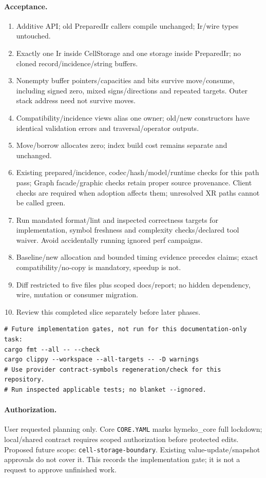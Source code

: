\documentclass[10pt,a4paper]{article}
\newcommand{\code}[1]{{\small\nolinkurl{#1}}}
\begin{document}
\paragraph{Acceptance.}
\begin{enumerate}
\item Additive API; old PreparedIr callers compile unchanged; Ir/wire types untouched.
\item Exactly one Ir inside CellStorage and one storage inside PreparedIr; no cloned record/incidence/string buffers.
\item Nonempty buffer pointers/capacities and bits survive move/consume, including signed zero, mixed signs/directions and repeated targets. Outer stack address need not survive moves.
\item Compatibility/incidence views alias one owner; old/new constructors have identical validation errors and traversal/operator outputs.
\item Move/borrow allocates zero; index build cost remains separate and unchanged.
\item Existing prepared/incidence, codec/hash/model/runtime checks for this path pass; Graph facade/graphic checks retain proper source provenance. Client checks are required when adoption affects them; unresolved XR paths cannot be called green.
\item Run mandated format/lint and inspected correctness targets for implementation, symbol freshness and complexity checks/declared tool waiver. Avoid accidentally running ignored perf campaigns.
\item Baseline/new allocation and bounded timing evidence precedes claims; exact compatibility/no-copy is mandatory, speedup is not.
\item Diff restricted to five files plus scoped docs/report; no hidden dependency, wire, mutation or consumer migration.
\item Review this completed slice separately before later phases.
\end{enumerate}
\begin{lstlisting}
# Future implementation gates, not run for this documentation-only task:
cargo fmt --all -- --check
cargo clippy --workspace --all-targets -- -D warnings
# Use provider contract-symbols regeneration/check for this repository.
# Run inspected applicable tests; no blanket --ignored.
\end{lstlisting}

\paragraph{Authorization.}
User requested planning only. Core \code{CORE.YAML} marks hymeko\_core full lockdown; local/shared contract requires scoped authorization before protected edits. Proposed future scope: \code{cell-storage-boundary}. Existing value-update/snapshot approvals do not cover it. This records the implementation gate; it is not a request to approve unfinished work.
\end{document}
